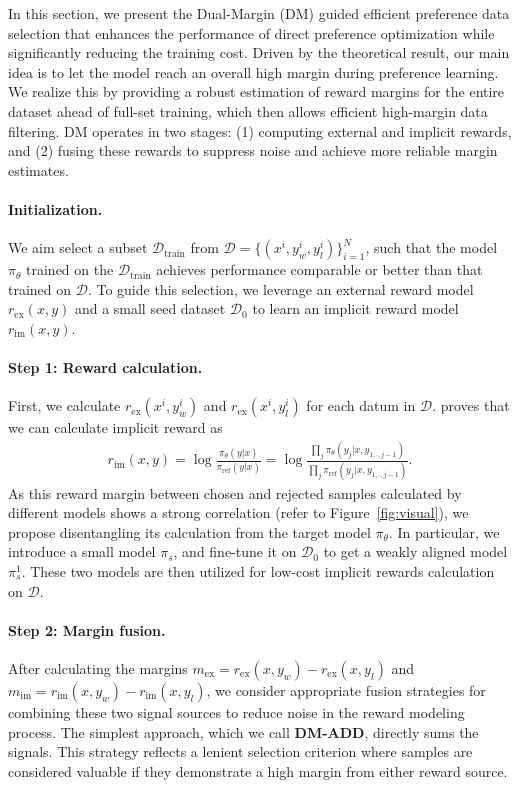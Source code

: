 In this section, we present the Dual-Margin (DM) guided efficient preference data selection that enhances the performance of direct preference optimization while significantly reducing the training cost. Driven by the theoretical result, our main idea is to let the model reach an overall high margin during preference learning. We realize this by providing a robust estimation of reward margins for the entire dataset ahead of full-set training, which then allows efficient high-margin data filtering. DM operates in two stages: (1) computing external and implicit rewards, and (2) fusing these rewards to suppress noise and achieve more reliable margin estimates.

\paragraph{Initialization.} We aim select a subset $\mathcal{D}_{\mathrm{train}}$ from $\mathcal{D}=\{(x^i,y_w^i,y_l^i)\}_{i=1}^{N}$, such that the model $\pi_{\theta}$ trained on the $\mathcal{D}_{\mathrm{train}}$ achieves performance comparable or better than that trained on $\mathcal{D}$. To guide this selection, we leverage an external reward model $r_{\mathrm{ex}}(x,y)$ and a small seed dataset $\mathcal{D}_0$ to learn an implicit reward model $r_{\mathrm{im}}(x,y)$. 

\paragraph{Step 1: Reward calculation.} First, we calculate $r_{\mathrm{ex}}(x^i,y_w^i)$ and $r_{\mathrm{ex}}(x^i,y_l^i)$ for each datum in $\mathcal{D}$. 
\citet{rafailov2024direct} proves that we can calculate implicit reward as 
\begin{align*}
   r_{\mathrm{im}}(x,y)=\log \frac{\pi_\theta (y|x)}{{\pi_{\mathrm{ref}}}(y|x)}=\log \frac{\prod_j \pi_{\theta}(y_j|x,y_{1,\cdot,j-1})}{\prod_j \pi_{\mathrm{ref}}(y_j|x,y_{1,\cdot,j-1})}.
\end{align*}
As this reward margin between chosen and rejected samples calculated by different models shows a strong correlation (refer to Figure~\ref{fig:visual}), we propose disentangling its calculation from the target model $\pi_\theta$. In particular, we introduce a small model $\pi_s$, and fine-tune it on $\mathcal{D}_0$ to get a weakly aligned model $\pi_s^1$. These two models are then utilized for low-cost implicit rewards calculation on $\mathcal{D}$.

\paragraph{Step 2: Margin fusion.} After calculating the margins $m_{\mathrm{ex}}=r_{\mathrm{ex}}(x,y_w)-r_{\mathrm{ex}}(x,y_l)$ and $m_{\mathrm{im}}=r_{\mathrm{im}}(x,y_w)-r_{\mathrm{im}}(x,y_l)$, we consider appropriate fusion strategies for combining these two signal sources to reduce noise in the reward modeling process. The simplest approach, which we call \textbf{DM-ADD}, directly sums the signals. This strategy reflects a lenient selection criterion where samples are considered valuable if they demonstrate a high margin from either reward source.

